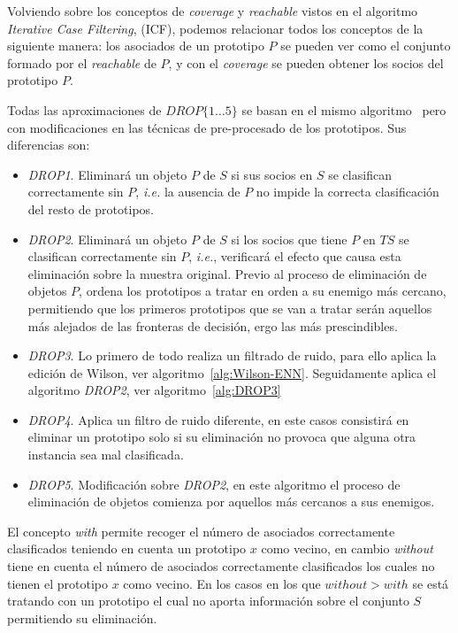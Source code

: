 Volviendo sobre los conceptos de \textit{coverage} y \textit{reachable} vistos en el algoritmo \textit{Iterative Case Filtering}, (ICF), podemos relacionar todos los conceptos de la siguiente manera: los asociados de un prototipo $P$ se pueden ver como el conjunto formado por el \textit{reachable} de $P$, y con el \textit{coverage} se pueden obtener los socios del prototipo $P$.

Todas las aproximaciones de $DROP\lbrace 1\dots5\rbrace$ se basan en el mismo algoritmo~\cite{wilson2000reduction} pero con modificaciones en las técnicas de pre-procesado de los prototipos. Sus diferencias son:
\begin{itemize}
\item \textit{DROP1}. Eliminará un objeto $P$ de $S$ si sus socios en $S$ se clasifican correctamente sin $P$, \textit{i.e.} la ausencia de $P$ no impide la correcta clasificación del resto de prototipos.
\item \textit{DROP2}. Eliminará un objeto $P$ de $S$ si los socios que tiene $P$ en $TS$ se clasifican correctamente sin $P$, \textit{i.e.}, verificará el efecto que causa esta eliminación sobre la muestra original. Previo al proceso de eliminación de objetos $P$, ordena los prototipos a tratar en orden a su enemigo más cercano, permitiendo que los primeros prototipos que se van a tratar serán aquellos más alejados de las fronteras de decisión, ergo las más prescindibles.
\item \textit{DROP3}. Lo primero de todo realiza un filtrado de ruido, para ello aplica la edición de Wilson, ver algoritmo~\ref{alg:Wilson-ENN}. Seguidamente aplica el algoritmo \textit{DROP2}, ver algoritmo~\ref{alg:DROP3}
\item \textit{DROP4}. Aplica un filtro de ruido diferente, en este casos consistirá en eliminar un prototipo solo si su eliminación no provoca que alguna otra instancia sea mal clasificada.
\item \textit{DROP5}. Modificación sobre \textit{DROP2}, en este algoritmo el proceso de eliminación de objetos comienza por aquellos más cercanos a sus enemigos. 
\end{itemize}

El concepto \textit{with} permite recoger el número de asociados correctamente clasificados teniendo en cuenta un prototipo $x$ como vecino, en cambio \textit{without} tiene en cuenta el número de asociados correctamente clasificados los cuales no tienen el prototipo $x$ como vecino. En los casos en los que $without > with$ se está tratando con un prototipo el cual no aporta información sobre el conjunto $S$ permitiendo su eliminación.

